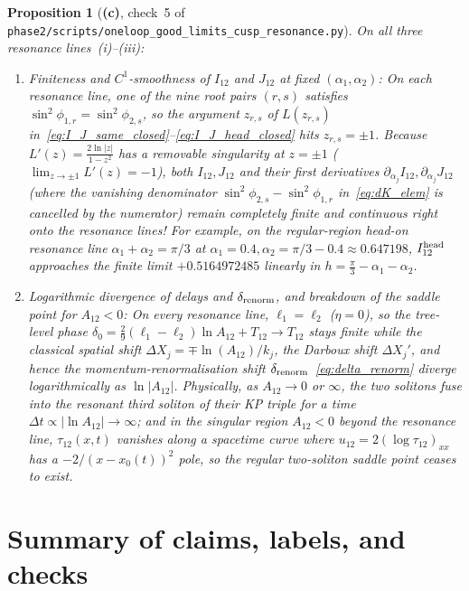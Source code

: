 \documentclass[11pt,a4paper]{article}
\newcommand{\Lc}{\textsf{\textbf{(c)}}}
\newcommand{\script}[1]{\texttt{phase2/\allowbreak scripts/\allowbreak #1}}
\newtheorem{proposition}{Proposition}[section]
\theoremstyle{remark}
\begin{document}
\begin{proposition}[\Lc, check~5 of \script{oneloop\_good\_limits\_cusp\_resonance.py}]\label{prop:resonance}
On all three resonance lines~(i)--(iii):
\begin{enumerate}
\item \emph{Finiteness and $C^1$-smoothness of $I_{12}$ and $J_{12}$ at fixed $(\alpha_1,\alpha_2)$:}
On each resonance line, one of the nine root pairs $(r,s)$ satisfies $\sin^2\phi_{1,r}=\sin^2\phi_{2,s}$, so the argument $z_{r,s}$ of $L(z_{r,s})$ in~\eqref{eq:I_J_same_closed}--\eqref{eq:I_J_head_closed} hits $z_{r,s}=\pm 1$. Because $L'(z)=\frac{2\ln|z|}{1-z^2}$ has a \emph{removable singularity} at $z=\pm 1$ ($\lim_{z\to\pm 1}L'(z)=-1$), both $I_{12},J_{12}$ and their first derivatives $\partial_{\alpha_j}I_{12},\partial_{\alpha_j}J_{12}$ (where the vanishing denominator $\sin^2\phi_{2,s}-\sin^2\phi_{1,r}$ in~\eqref{eq:dK_elem} is cancelled by the numerator) remain \emph{completely finite and continuous} right onto the resonance lines! For example, on the regular-region head-on resonance line $\alpha_1+\alpha_2=\pi/3$ at $\alpha_1=0.4,\alpha_2=\pi/3-0.4\approx 0.647198$, $I_{12}^{\rm head}$ approaches the finite limit $+0.5164972485$ linearly in $h=\frac{\pi}{3}-\alpha_1-\alpha_2$.
\item \emph{Logarithmic divergence of delays and $\delta_{\rm renorm}$, and breakdown of the saddle point for $A_{12}<0$:}
On every resonance line, $\ell_1=\ell_2$ ($\eta=0$), so the tree-level phase $\delta_0=\tfrac29(\ell_1-\ell_2)\ln A_{12}+T_{12}\to T_{12}$ stays finite while the classical spatial shift $\Delta X_j=\mp\ln(A_{12})/k_j$, the Darboux shift $\Delta X_j'$, and hence the momentum-renormalisation shift $\delta_{\rm renorm}$~\eqref{eq:delta_renorm} \emph{diverge logarithmically as $\ln|A_{12}|$}. Physically, as $A_{12}\to 0$ or $\infty$, the two solitons fuse into the resonant third soliton of their KP triple for a time $\Delta t\propto|\ln A_{12}|\to\infty$; and in the singular region $A_{12}<0$ beyond the resonance line, $\tau_{12}(x,t)$ vanishes along a spacetime curve where $u_{12}=2(\log\tau_{12})_{xx}$ has a $-2/(x-x_0(t))^2$ pole, so the regular two-soliton saddle point ceases to exist.
\end{enumerate}
\end{proposition}

\section{Summary of claims, labels, and checks}
\end{document}
